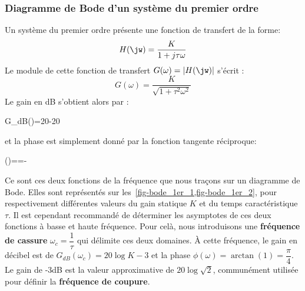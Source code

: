 \subsubsection*{Diagramme de Bode d'un système du premier ordre}
Un système du premier ordre présente une fonction de transfert de la forme:
\begin{align}
H(\jw)=\dfrac{K}{1+j\tau\omega }\label{eq-1er_ftjw}
\end{align}
Le module de cette fonction de transfert $G(\omega) =|H(\jw)|$ s'écrit :
\[
    G(\omega)=\dfrac{K}{\sqrt{1+\tau^2\omega^2}}
\]
Le gain en dB s'obtient alors par :
\begin{bequation}
    G_{dB}(\omega)=20-20\label{eq-gain_1er}
\end{bequation}
et la phase est simplement donné par la fonction tangente réciproque:
\begin{bequation}
    \phi(\omega)==-\arctan{(\tau\omega)}\label{eq-phase_1er} 
\end{bequation}
Ce sont ces deux fonctions de la fréquence que nous traçons sur un diagramme
de Bode. Elles sont représentés sur les~\cref{fig-bode_1er_1,fig-bode_1er_2}, 
pour respectivement différentes valeurs du gain statique $K$ et du temps 
caractéristique $\tau$.
\newline
Il est cependant recommandé de déterminer les asymptotes 
de ces deux fonctions à basse et haute fréquence. 
Pour celà, nous introduisons une \textbf{fréquence de cassure} 
$\omega_c=\dfrac{1}{\tau}$ qui délimite ces deux domaines.
\`A cette fréquence, le gain en décibel est de $G_{dB}(\omega_c)=20\log{K}-3$ 
et la phase $\phi(\omega)=\arctan{(1)}=\dfrac{\pi}{4}$.
Le gain de -3dB est la valeur approximative de $20\log{\sqrt{2}}$, communément
utilisée pour définir la \textbf{fréquence de coupure}.

